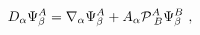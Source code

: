 \begin{equation} 
        D_\alpha\Psi_\beta^A=\nabla_\alpha\Psi_\beta^A+ A_\alpha{\cal P}^A_{\;B}\Psi_\beta^B\ ,
        \end{equation} 
